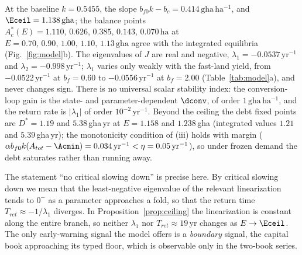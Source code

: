At the baseline $k=0.5455$, the slope $b_{f0}k-b_c=0.414\,\mathrm{gha\,ha^{-1}}$, and $\Eceil=1.138\,\mathrm{gha}$; the balance points $A_c^*(E)=1.110,\,0.626,\,0.385,\,0.143,\,0.070\,\mathrm{ha}$ at $E=0.70,\,0.90,\,1.00,\,1.10,\,1.13\,\mathrm{gha}$ agree with the integrated equilibria (Fig.~\ref{fig:model}b). The eigenvalues of $J$ are real and negative, $\lambda_1=-0.0537\,\mathrm{yr}^{-1}$ and $\lambda_2=-0.998\,\mathrm{yr}^{-1}$; $\lambda_1$ varies only weakly with the fast-land yield, from $-0.0522\,\mathrm{yr}^{-1}$ at $b_f=0.60$ to $-0.0556\,\mathrm{yr}^{-1}$ at $b_f=2.00$ (Table~\ref{tab:model}a), and never changes sign. There is no universal scalar stability index: the conversion-loop gain is the state- and parameter-dependent $\dconv$, of order $1\,\mathrm{gha\,ha^{-1}}$, and the return rate is $|\lambda_1|$ of order $10^{-2}\,\mathrm{yr}^{-1}$. Beyond the ceiling the debt fixed points are $D^*=1.19$ and $5.38$\,gha\,yr at $E=1.158$ and $1.238$\,gha (integrated values $1.21$ and $5.39$\,gha\,yr); the monotonicity condition of (iii) holds with margin ($\alpha b_{f0}k(A_{tot}-\Acmin)=0.034\,\mathrm{yr}^{-1}<\eta=0.05\,\mathrm{yr}^{-1}$), so under frozen demand the debt saturates rather than running away.

The statement ``no critical slowing down'' is precise here. By critical slowing down we mean that the least-negative eigenvalue of the relevant linearization tends to $0^-$ as a parameter approaches a fold, so that the return time $T_{ret}\approx-1/\lambda_1$ diverges. In Proposition~\ref{prop:ceiling} the linearization is constant along the entire branch, so neither $\lambda_1$ nor $T_{ret}\approx19$\,yr changes as $E\to\Eceil$. The only early-warning signal the model offers is a \emph{boundary} signal, the capital book approaching its typed floor, which is observable only in the two-book series.


